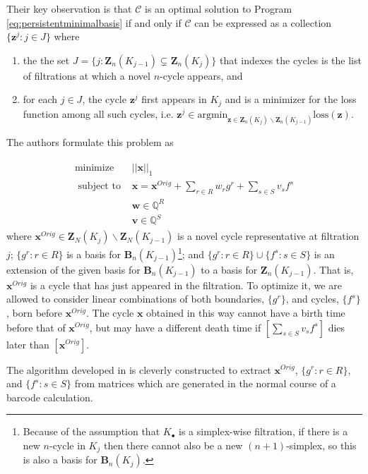 \documentclass[11pt,onecolumn]{article}
\newcommand{\Q}{\mathbb{Q}}
\newcommand{\Boundaries}[0]{\mathbf{B}}
\newcommand{\Cycles}[0]{\mathbf{Z}}
\newcommand{\originalrep}{\mathbf{x}^{Orig}}
\newcommand{\optimalrep}{\mathbf{x}}
\newcommand{\cycle}{{\mathbf z}}
\newcommand{\boundingchain}{\mathbf{w}}
\newcommand{\loss}{\mathrm{loss}}
\newcommand{\argmin}{\mathrm{argmin}}
\newcommand{\fcyclebasis}{\mathcal{C}}
\newcommand{\pr}{Program }
\theoremstyle{plain}
\theoremstyle{definition}
\begin{document}
 
Their key observation is that $\fcyclebasis$ is an optimal solution to \pr \eqref{eq:persistentminimalbasis} if and only if $\fcyclebasis$ can be expressed as a collection $\{\cycle^j : j \in J\}$ where  \begin{enumerate}
    \item the the set $J = \{j :  \Cycles_n(K_{j-1}) \subsetneq \Cycles_n(K_j) \}$ that indexes the cycles is the list of filtrations at which a novel $n$-cycle appears, and
    \item for each $j \in J$, the cycle $\cycle^j$ first appears in $K_j$ and is a minimizer for the loss function among all such cycles, i.e. $\cycle^j \in \argmin_{\cycle \in \Cycles_n(K_j) \backslash \Cycles_n(K_{j-1})} \loss(\cycle).$
\end{enumerate}
The authors formulate this problem as 

 
\begin{align}
\begin{split}
\text{minimize } & ||\mathbf{x} ||_1  \\
\text{ subject to } & \mathbf{x} = \originalrep + \sum_{r\in R} w_r g^r + \sum_{s \in S} v_s f^s \\
& \boundingchain \in \Q^R  \\
& \mathbf{v} \in \Q^S
\end{split}
\label{eq:escolarargmin}
\end{align}
where $\originalrep \in\Cycles_N(K_j) \backslash \Cycles_N(K_{j-1})$ is a novel cycle representative at filtration $j$; $\{g^r : r \in R\}$ is a basis for $\Boundaries_n(K_{j-1})$\footnote{Because of the assumption that $K_\bullet$ is a simplex-wise filtration, if there is a new $n$-cycle in $K_j$ then there cannot also be a new $(n+1)$-simplex, so this is also a basis for $\Boundaries_n(K_j).$}; and $\{g^r : r \in R\} \cup \{f^s : s \in S\}$ is an extension of the given basis for $\Boundaries_n(K_{j-1})$ to a basis for $\Cycles_n(K_{j-1})$. That is, $\originalrep$ is a cycle that has just appeared in the filtration. To optimize it, we are allowed to consider linear combinations of both boundaries, $\{g^r\}$, and cycles, $\{f^s\}$, born before $\originalrep.$ The cycle $\optimalrep$ obtained in this way cannot have a birth time before that of $\originalrep$, but may have a different death time if $[\sum_{s\in S}v_sf^s]$ dies later than $[\originalrep]$. 

 

The algorithm developed in \cite{Escolar2016} is cleverly constructed to extract $\originalrep$, $\{g^r : r \in R\}$, and $\{f^s : s \in S\}$ from matrices which are generated in the normal course of a barcode calculation.
\end{document}
